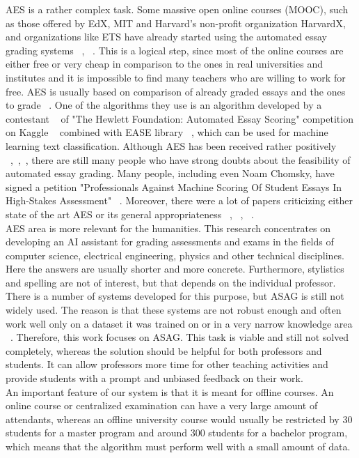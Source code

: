 AES is a rather complex task. Some massive open online courses (MOOC), such as those offered by EdX, MIT and Harvard's non-profit organization HarvardX, and organizations like ETS have already started using the automated essay grading systems  ~\cite{Balfour}, ~\cite{aesOverview}. This is a logical step, since most of the online courses are either free or very cheap in comparison to the ones in real universities and institutes and it is impossible to find many teachers who are willing to work for free. AES is usually based on comparison of already graded essays and the ones to grade ~\cite{Blood}. One of the algorithms they use is an algorithm developed by a contestant ~\cite{vikGit} of "The Hewlett Foundation: Automated Essay Scoring" competition on Kaggle ~\cite{HewlettKaggle} combined with EASE library ~\cite{edxGit}, which can be used for machine learning text classification. Although AES has been received rather positively ~\cite{aesOverview},~\cite{Shermis},~\cite{Alikaniotis}, there are still many people who have strong doubts about the feasibility of automated essay grading. Many people, including even Noam Chomsky, have signed a petition "Professionals Against Machine Scoring Of Student Essays In High-Stakes Assessment" ~\cite{petition}. Moreover, there were a lot of papers criticizing either state of the art AES or its general appropriateness ~\cite{Perelman}, ~\cite{Byrne}, ~\cite{Ramineni}.\\

AES area is more relevant for the humanities. This research concentrates on developing an AI assistant for grading assessments and exams in the fields of computer science, electrical engineering, physics and other technical disciplines. Here the answers are usually shorter and more concrete. Furthermore, stylistics and spelling are not of interest, but that depends on the individual professor. There is a number of systems developed for this purpose, but ASAG is still not widely used. The reason is that these systems are not robust enough and often work well only on a dataset it was trained on or in a very narrow knowledge area ~\cite{Mohler}. Therefore, this work focuses on ASAG. This task is viable and still not solved completely, whereas the solution should be helpful for both professors and students. It can allow professors more time for other teaching activities and provide students with a prompt and unbiased feedback on their work.\\

An important feature of our system is that it is meant for offline courses. An online course or centralized examination can have a very large amount of attendants, whereas an offline university course would usually be restricted by 30 students for a master program and around 300 students for a bachelor program, which means that the algorithm must perform well with a small amount of data.

